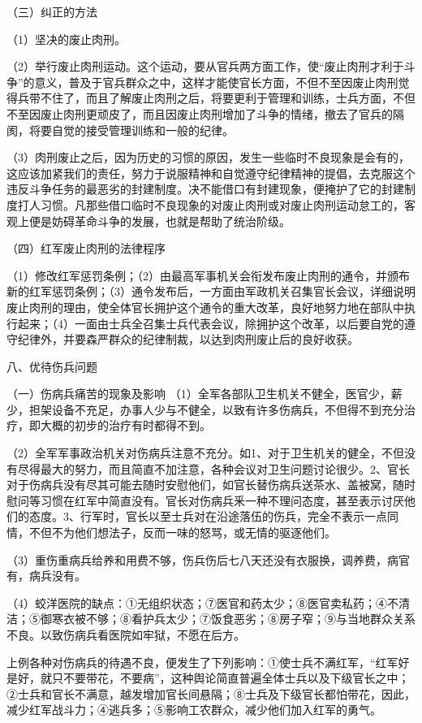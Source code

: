 （三）纠正的方法

（1）坚决的废止肉刑。

（2）举行废止肉刑运动。这个运动，要从官兵两方面工作，使“废止肉刑才利于斗争”的意义，普及于官兵群众之中，这样才能使官长方面，不但不至因废止肉刑觉得兵带不住了，而且了解废止肉刑之后，将要更利于管理和训练，士兵方面，不但不至因废止肉刑更顽皮了，而且因废止肉刑增加了斗争的情绪，撤去了官兵的隔阂，将要自觉的接受管理训练和一般的纪律。

（3）肉刑废止之后，因为历史的习惯的原因，发生一些临时不良现象是会有的，这应该加紧我们的责任，努力于说服精神和自觉遵守纪律精神的提倡，去克服这个违反斗争任务的最恶劣的封建制度。决不能借口有封建现象，便掩护了它的封建制度打人习惯。凡那些借口临时不良现象的对废止肉刑或对废止肉刑运动怠工的，客观上便是妨碍革命斗争的发展，也就是帮助了统治阶级。

（四）红军废止肉刑的法律程序


（1）修改红军惩罚条例；（2）由最高军事机关会衔发布废止肉刑的通令，并颁布新的红军惩罚条例；（3）通令发布后，一方面由军政机关召集官长会议，详细说明废止肉刑的理由，使全体官长拥护这个通令的重大改革，良好地努力地在部队中执行起来；（4）一面由士兵全召集士兵代表会议，除拥护这个改革，以后要自党的遵守纪律外，并要森严群众的纪律制裁，以达到肉刑废止后的良好收获。

八、优待伤兵问题

（一）伤病兵痛苦的现象及影响 
（1）全军各部队卫生机关不健全，医官少，薪少，担架设备不充足，办事人少与不健全，以致有许多伤病兵，不但得不到充分治疗，即大概的初步的治疗有时都得不到。

（2）全军军事政治机关对伤病兵注意不充分。如1、对于卫生机关的健全，不但没有尽得最大的努力，而且简直不加注意，各种会议对卫生问题讨论很少。2、官长对于伤病兵没有尽其可能去随时安慰他们，如官长替伤病兵送茶水、盖被窝，随时慰问等习惯在红军中简直没有。官长对伤病兵釆一种不理问态度，甚至表示讨厌他们的态度。3、行军时，官长以至士兵对在沿途落伍的伤兵，完全不表示一点同情，不但不为他们想法子，反而一味的怒骂，或无情的驱逐他们。

（3）重伤重病兵给养和用费不够，伤兵伤后七八天还没有衣服换，调养费，病官有，病兵没有。

（4）蛟洋医院的缺点：①无组织状态；⑦医官和药太少；⑧医官卖私药；④不清洁；⑤御寒衣被不够；⑧看护兵太少；⑦饭食恶劣；⑧房子窄；⑨与当地群众关系不良。以致伤病兵看医院如牢狱，不愿在后方。

上例各种对伤病兵的待遇不良，便发生了下列影响：①使士兵不满红军，“红军好是好，就只不要带花，不要病”，这种舆论简直普遍全体士兵以及下级官长之中；②士兵和官长不满意，越发增加官长间悬隔；⑧士兵及下级官长都怕带花，因此，减少红军战斗力；④逃兵多；⑤影响工农群众，减少他们加入红军的勇气。

